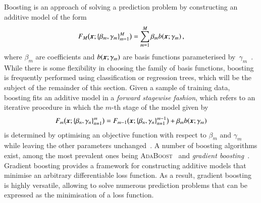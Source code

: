 Boosting is an approach of solving a prediction problem by constructing an
additive model of the form
\begin{align*}
  F_{M}\bigl(\myvec{x}; \{ \beta_m, \gamma_{m} \}_{m=1}^{M} \bigr) = \sum_{m = 1}^{M} \beta_m b(\myvec{x}; \gamma_{m}) \,\text{,}
\end{align*}
where $\beta_m$ are coefficients and $b(\myvec{x}; \gamma_{m})$ are basis
functions parameterised
by~$\gamma_{m}$~\cite{Friedman:2000,Friedman:2001wbq}. While there is some
flexibility in choosing the family of basis functions, boosting is frequently
performed using classification or regression trees, which will be the subject of
the remainder of this section. Given a sample of training data, boosting fits an
additive model in a \emph{forward stagewise fashion}, which refers to an
iterative procedure in which the $m$-th stage of the model given by
\begin{align*}
  F_{m}\bigl(\myvec{x}; \{ \beta_{n}, \gamma_{n} \}_{n=1}^{m} \bigr) = F_{m - 1}\bigl( \myvec{x}; \{ \beta_{n}, \gamma_{n} \}_{n=1}^{m-1} \bigr) + \beta_m b(\myvec{x}; \gamma_{m})
\end{align*}
is determined by optimising an objective function with respect to $\beta_{m}$
and $\gamma_{m}$ while leaving the other parameters unchanged~\cite{hastie09}. A
number of boosting algorithms exist, among the most prevalent ones being
\textsc{AdaBoost}~\cite{freund_shapire:adaboost,freund_shapire:adaboost2} and
\emph{gradient boosting}~\cite{Friedman:2001wbq}. Gradient boosting provides a
framework for constructing additive models that minimise an arbitrary
differentiable loss function. As a result, gradient boosting is highly
versatile, allowing to solve numerous prediction problems that can be expressed
as the minimisation of a loss function.


